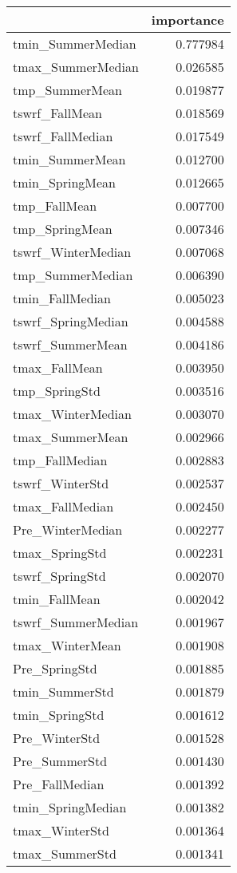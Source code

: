 \begin{tabular}{lr}
\toprule
 & importance \\
\midrule
tmin_SummerMedian & 0.777984 \\
tmax_SummerMedian & 0.026585 \\
tmp_SummerMean & 0.019877 \\
tswrf_FallMean & 0.018569 \\
tswrf_FallMedian & 0.017549 \\
tmin_SummerMean & 0.012700 \\
tmin_SpringMean & 0.012665 \\
tmp_FallMean & 0.007700 \\
tmp_SpringMean & 0.007346 \\
tswrf_WinterMedian & 0.007068 \\
tmp_SummerMedian & 0.006390 \\
tmin_FallMedian & 0.005023 \\
tswrf_SpringMedian & 0.004588 \\
tswrf_SummerMean & 0.004186 \\
tmax_FallMean & 0.003950 \\
tmp_SpringStd & 0.003516 \\
tmax_WinterMedian & 0.003070 \\
tmax_SummerMean & 0.002966 \\
tmp_FallMedian & 0.002883 \\
tswrf_WinterStd & 0.002537 \\
tmax_FallMedian & 0.002450 \\
Pre_WinterMedian & 0.002277 \\
tmax_SpringStd & 0.002231 \\
tswrf_SpringStd & 0.002070 \\
tmin_FallMean & 0.002042 \\
tswrf_SummerMedian & 0.001967 \\
tmax_WinterMean & 0.001908 \\
Pre_SpringStd & 0.001885 \\
tmin_SummerStd & 0.001879 \\
tmin_SpringStd & 0.001612 \\
Pre_WinterStd & 0.001528 \\
Pre_SummerStd & 0.001430 \\
Pre_FallMedian & 0.001392 \\
tmin_SpringMedian & 0.001382 \\
tmax_WinterStd & 0.001364 \\
tmax_SummerStd & 0.001341 \\

\end{tabular}
